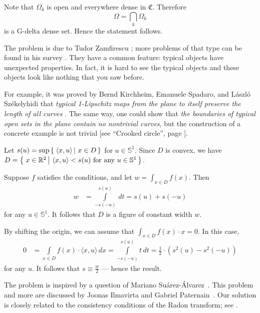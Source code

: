 Note that $\Omega_k$ is open and everywhere dense in $\mathfrak{C}$.
Therefore 
\[\Omega=\bigcap_k\Omega_k\]
is a G-delta dense set.
Hence the statement follows.\qeds

The problem is due to Tudor Zamfirescu \cite{zamfirescu1980};
more problems of that type can be found in his survey \cite{zamfirescu}.
They have a common feature: typical objects have unexpected properties.
In fact, it is hard to see the typical objects and these objects look like nothing that you saw before.

For example, it was proved by
Bernd Kirchheim, 
Emanuele Spadaro, 
and 
L{\'a}szl{\'o} Sz{\'e}kelyhidi
that \textit{typical 1-Lipschitz maps from the plane to itself preserve the length of all curves} \cite{KSS}.
The same way, one could show that \textit{the boundaries of typical open sets in the plane contain no nontrivial curves}, 
but the construction of a concrete example is not trivial
[see ``Crooked circle'', page \pageref{Crooked circle}].


Let $s(u) = \sup\set{\langle x, u \rangle}{x \in D}$
for $u \in \mathbb{S}^1$.
Since $D$ is convex, we have $D = \set{x \in \mathbb{R}^2}{\langle x, u \rangle < s(u)\ \text{for any}\ u\in \mathbb{S}^1}$.

Suppose $f$ satisfies the conditions, and let $w = \int_{x \in D} f(x)$.
Then
\begin{align*}
w
&= \int\limits_{-s(-u)}^{s(u)} \, dt = s(u) + s(-u)
\end{align*}
for any $u \in \mathbb{S}^1$.
It follows that $D$ is a figure of constant width $w$.

By shifting the origin, we can assume that $\int_{x \in D} f(x) \cdot x = 0$.
In this case,
\begin{align*}
0
&= \int\limits_{x \in D} f(x) \cdot \langle x, u \rangle \, dx = \int\limits_{-s(-u)}^{s(u)} t \, dt = \tfrac{1}{2} \cdot (s^2(u) - s^2(-u))
\end{align*}
for any $u$.
It follows that $s \equiv \tfrac{w}{2}$ --- hence the result.
\qeds

The problem is inspired by a question of Mariano Suárez-Álvarez~\cite{suarez-alvarez}.
This problem and more are discussed by Joonas Ilmavirta and Gabriel Paternain~\cite{ilmavirta-paternain}.
Our solution is closely related to the consistency conditions of the Radon transform;
see \cite[Lemma 2.3, Chapter I]{helgason}.


